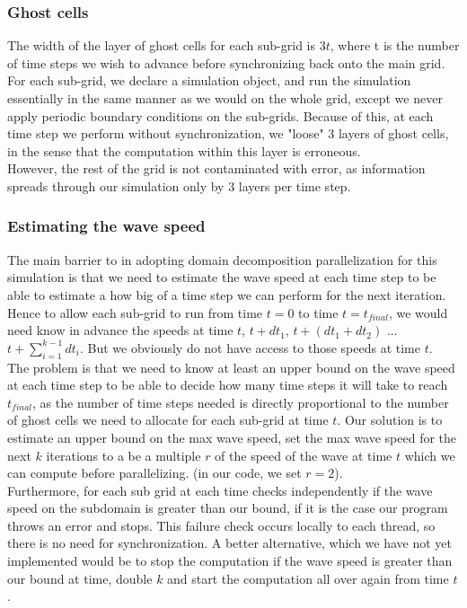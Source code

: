 \documentclass[11pt]{article}
\begin{document}
\subsubsection{Ghost cells}

The width of the layer of ghost cells for each sub-grid is $3t$, where t is the number of time steps we wish to advance before synchronizing back onto the main grid. For each sub-grid, we declare a simulation object, and run the simulation essentially in the same manner as we would on the whole grid, except we never apply periodic boundary conditions on the sub-grids. Because of this, at each time step we perform without synchronization, we "loose" 3 layers of ghost cells, in the sense that the computation within this layer is erroneous. \\

However, the rest of the grid is not contaminated with error, as information spreads through our simulation only by 3 layers per time step.

\subsubsection{Estimating the wave speed}
The main barrier to in adopting domain decomposition parallelization for this simulation is that we need to estimate the wave speed at each time step to be able to estimate a how big of a time step we can perform for the next iteration. Hence to allow each sub-grid to run from time $t=0$ to time $t=t_{final}$, we would need know in advance the speeds at time $t$, $t + dt_1$, $t + (dt_1+dt_2)$ ... $t+\sum_{i=1}^{k-1}dt_i$. But we obviously do not have access to those speeds at time $t$. \\

The problem is that we need to know at least an upper bound on the wave speed at each time step to be able to decide how many time steps it will take to reach $t_{final}$, as the number of time steps needed is directly proportional to the number of ghost cells we need to allocate for each sub-grid at time $t$. Our solution is to estimate an upper bound on the max wave speed, set the max wave speed for the next $k$ iterations to a be a multiple $r$ of the speed of the wave at time $t$ which we can compute before parallelizing. (in our code, we set $r=2$). \\

Furthermore, for each sub grid at each time checks independently if the wave speed on the subdomain is greater than our bound, if it is the case our program throws an error and stops. This failure check occurs locally to each thread, so there is no need for synchronization. A better alternative, which we have not yet implemented would be to stop the computation if the wave speed is greater than our bound at time, double $k$ and start the computation all over again from time $t$.
\end{document}
